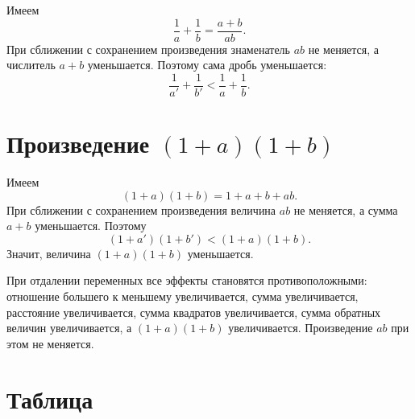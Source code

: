 Имеем
\[
    \frac1a+\frac1b=\frac{a+b}{ab}.
\]
При сближении с сохранением произведения знаменатель $ab$ не меняется, а числитель $a+b$ уменьшается. Поэтому сама дробь уменьшается:
\[
    \frac1{a'}+\frac1{b'}<\frac1a+\frac1b.
\]

\medskip

\section{Произведение $(1+a)(1+b)$}

Имеем
\[
    (1+a)(1+b)=1+a+b+ab.
\]
При сближении с сохранением произведения величина $ab$ не меняется, а сумма $a+b$ уменьшается. Поэтому
\[
    (1+a')(1+b')<(1+a)(1+b).
\]
Значит, величина $(1+a)(1+b)$ уменьшается.

\newpage

\begin{remarkbox}
    При отдалении переменных все эффекты становятся противоположными: отношение большего к меньшему увеличивается, сумма увеличивается, расстояние увеличивается, сумма квадратов увеличивается, сумма обратных величин увеличивается, а $(1+a)(1+b)$ увеличивается. Произведение $ab$ при этом не меняется.
\end{remarkbox}

\medskip

\section{Таблица}

